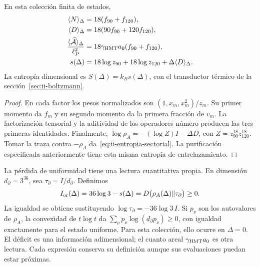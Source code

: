 \begin{proposition}
En esta colección finita de estados,
\begin{align}
 \langle N\rangle_\Delta&=18(f_{90}+f_{120}),\\
 \langle D\rangle_\Delta&=18(90f_{90}+120f_{120}),\\
 \frac{\langle\widehat{\mathcal A}\rangle_\Delta}{\ell_P^2}
 &=18\gamma_{\mathrm{HMT}}a_0(f_{90}+f_{120}),
 \label{eq:ii-area-media}\\
 s(\Delta)&=18\log z_{90}+18\log z_{120}
                  +\Delta\langle D\rangle_\Delta.
 \label{eq:ii-entropia-sectorial}
\end{align}
La entropía dimensional es $S(\Delta)=k_Bs(\Delta)$, con el
transductor térmico de la sección~\ref{sec:ii-boltzmann}.
\end{proposition}
\begin{proof}
En cada factor los pesos normalizados son
$(1,x_m,x_m^2)/z_m$. Su primer momento da $f_m$ y su segundo
momento da la primera fracción de $v_m$. La factorización tensorial
y la aditividad de los operadores número producen las tres primeras
identidades. Finalmente,
$\log\rho_A=-(\log Z)I-\Delta D$, con
$Z=z_{90}^{18}z_{120}^{18}$. Tomar la traza contra $-\rho_A$
da~\eqref{eq:ii-entropia-sectorial}. La purificación especificada
anteriormente tiene esta misma entropía de entrelazamiento.
\end{proof}

La pérdida de uniformidad tiene una lectura cuantitativa propia.
En dimensión \(d_\partial=3^{36}\), sea
\(\tau_\partial=I/d_\partial\). Definimos
\begin{equation}
 I_{\rm or}(\Delta)=36\log3-s(\Delta)
 =D\bigl(\rho_A(\Delta)\Vert\tau_\partial\bigr)\ge0.
 \label{eq:ii-area-deficit-informacional}
\end{equation}
La igualdad se obtiene sustituyendo
\(\log\tau_\partial=-36\log3\,I\). Si \(p_\nu\) son los
autovalores de \(\rho_A\), la convexidad de \(t\log t\) da
\(\sum_\nu p_\nu\log(d_\partial p_\nu)\ge0\), con igualdad
exactamente para el estado uniforme. Para esta colección, ello ocurre en
\(\Delta=0\). El déficit es una información adimensional; el cuanto
areal \(\gamma_{\mathrm{HMT}}a_0\) es otra lectura. Cada expresión conserva
su definición aunque sus evaluaciones puedan estar próximas.

